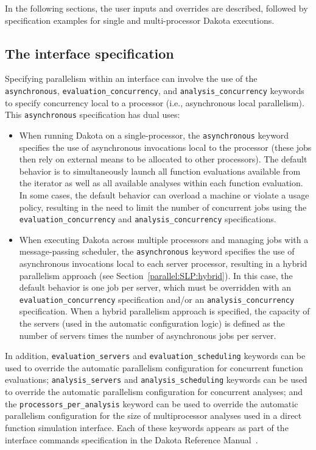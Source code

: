 In the following sections, the user inputs and overrides are
described, followed by specification examples for single and
multi-processor Dakota executions.

\subsection{The interface specification}\label{parallel:spec:interface}

Specifying parallelism within an interface can involve the use of the
\texttt{asynchronous}, \texttt{evaluation\_concurrency}, and
\texttt{analysis\_concurrency} keywords to specify concurrency local
to a processor (i.e., asynchronous local parallelism). This
\texttt{asynchronous} specification has dual uses:

\begin{itemize}
\item When running Dakota on a single-processor, the
  \texttt{asynchronous} keyword specifies the use of asynchronous
  invocations local to the processor (these jobs then rely on external
  means to be allocated to other processors). The default behavior is
  to simultaneously launch all function evaluations available from the
  iterator as well as all available analyses within each function
  evaluation. In some cases, the default behavior can overload a
  machine or violate a usage policy, resulting in the need to limit
  the number of concurrent jobs using the
  \texttt{evaluation\_concurrency} and \texttt{analysis\_concurrency}
  specifications.

\item When executing Dakota across multiple processors and managing
  jobs with a message-passing scheduler, the \texttt{asynchronous}
  keyword specifies the use of asynchronous invocations local to each
  server processor, resulting in a hybrid parallelism approach (see
  Section~\ref{parallel:SLP:hybrid}). In this case, the default
  behavior is one job per server, which must be overridden with an
  \texttt{evaluation\_concurrency} specification and/or an
  \texttt{analysis\_concurrency} specification. When a hybrid
  parallelism approach is specified, the capacity of the servers (used
  in the automatic configuration logic) is defined as the number of
  servers times the number of asynchronous jobs per server.
\end{itemize}

In addition, \texttt{evaluation\_servers} and
\texttt{evaluation\_scheduling} keywords can be used to
override the automatic parallelism configuration for concurrent
function evaluations; \texttt{analysis\_servers} and
\texttt{analysis\_scheduling} keywords can be used to override
the automatic parallelism configuration for concurrent analyses; and
the \texttt{processors\_per\_analysis} keyword can be used to override
the automatic parallelism configuration for the size of multiprocessor
analyses used in a direct function simulation interface. Each of these
keywords appears as part of the interface commands specification in
the Dakota Reference Manual~\cite{RefMan}.

